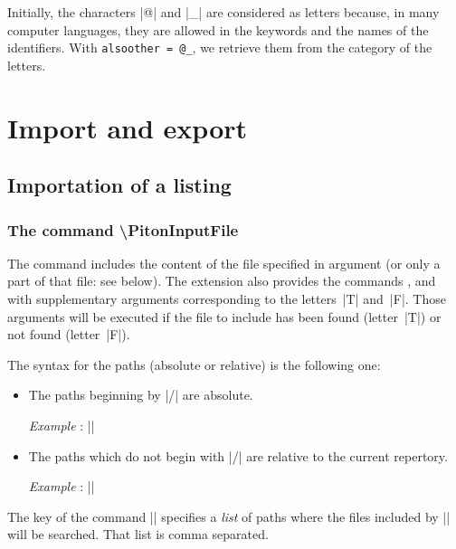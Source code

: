 \documentclass{article}
\begin{document}
Initially, the characters |@| and |_| are considered as letters because, in
many computer languages, they are allowed in the keywords and the names of
the identifiers. With \verb|alsoother = @_|, we retrieve them from the
category of the letters. 

\section{Import and export}


\subsection{Importation of a listing}

\label{PitonInputFile}

\subsubsection{The command \textbackslash PitonInputFile}


The command  includes the content of the
file specified in argument (or only a part of that file: see below). The
extension  also provides the commands
,  and
 with supplementary arguments
corresponding to the letters~|T| and~|F|. Those arguments will be executed if
the file to include has been found (letter~|T|) or not found (letter~|F|).

\smallskip
The syntax for the paths (absolute or relative) is the following one:
\begin{itemize}
\item The paths beginning by |/| are absolute.

\emph{Example} : ||

\item The paths which do not begin with |/| are relative to the current
repertory. 

\emph{Example} : ||
\end{itemize}

The key  of the command |\PitonOptions| specifies a
\emph{list} of paths where the files included by |\PitonInputFile| will be
searched. That list is comma separated.
\end{document}
